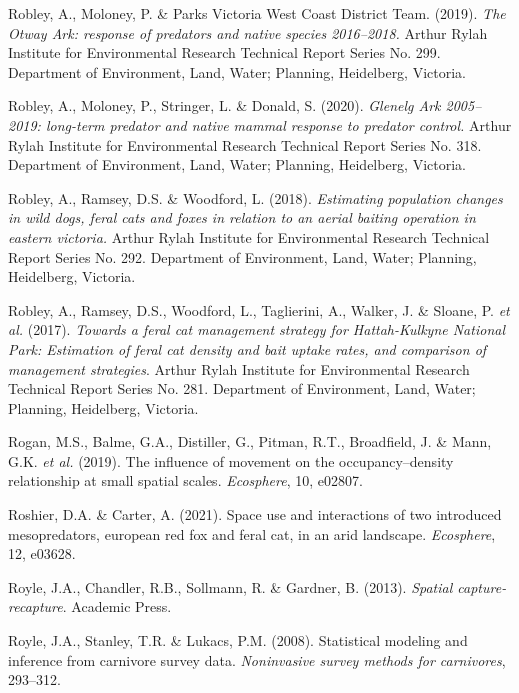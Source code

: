 \documentclass[11pt,a4paper,titlepage,twoside,openright]{style/unimelbthesis}
\begin{document}
\begin{mainmatter}
\leavevmode\hypertarget{ref-robley2019otway}{}%
Robley, A., Moloney, P. \& Parks Victoria West Coast District Team. (2019). \emph{The Otway Ark: response of predators and native species 2016--2018.} Arthur Rylah Institute for Environmental Research Technical Report Series No. 299. Department of Environment, Land, Water; Planning, Heidelberg, Victoria.

\leavevmode\hypertarget{ref-robley2020glenelg}{}%
Robley, A., Moloney, P., Stringer, L. \& Donald, S. (2020). \emph{Glenelg Ark 2005--2019: long-term predator and native mammal response to predator control.} Arthur Rylah Institute for Environmental Research Technical Report Series No. 318. Department of Environment, Land, Water; Planning, Heidelberg, Victoria.

\leavevmode\hypertarget{ref-robley2018estimating}{}%
Robley, A., Ramsey, D.S. \& Woodford, L. (2018). \emph{Estimating population changes in wild dogs, feral cats and foxes in relation to an aerial baiting operation in eastern victoria.} Arthur Rylah Institute for Environmental Research Technical Report Series No. 292. Department of Environment, Land, Water; Planning, Heidelberg, Victoria.

\leavevmode\hypertarget{ref-robley2017towards}{}%
Robley, A., Ramsey, D.S., Woodford, L., Taglierini, A., Walker, J. \& Sloane, P. \emph{et al.} (2017). \emph{Towards a feral cat management strategy for Hattah-Kulkyne National Park: Estimation of feral cat density and bait uptake rates, and comparison of management strategies}. Arthur Rylah Institute for Environmental Research Technical Report Series No. 281. Department of Environment, Land, Water; Planning, Heidelberg, Victoria.

\leavevmode\hypertarget{ref-rogan2019influence}{}%
Rogan, M.S., Balme, G.A., Distiller, G., Pitman, R.T., Broadfield, J. \& Mann, G.K. \emph{et al.} (2019). The influence of movement on the occupancy--density relationship at small spatial scales. \emph{Ecosphere}, 10, e02807.

\leavevmode\hypertarget{ref-roshier2021space}{}%
Roshier, D.A. \& Carter, A. (2021). Space use and interactions of two introduced mesopredators, european red fox and feral cat, in an arid landscape. \emph{Ecosphere}, 12, e03628.

\leavevmode\hypertarget{ref-royle2013spatial}{}%
Royle, J.A., Chandler, R.B., Sollmann, R. \& Gardner, B. (2013). \emph{Spatial capture-recapture}. Academic Press.

\leavevmode\hypertarget{ref-royle2008statistical}{}%
Royle, J.A., Stanley, T.R. \& Lukacs, P.M. (2008). Statistical modeling and inference from carnivore survey data. \emph{Noninvasive survey methods for carnivores}, 293--312.


\end{mainmatter}
\end{document}
